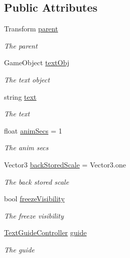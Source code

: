 \subsection*{Public Attributes}
\begin{DoxyCompactItemize}
\item 
Transform \hyperlink{class_lerp2_a_p_i_1_1_effects_1_1___text_1_1_text_guide_base_a71d7d66b8dba870a0de98ea212b8fbef}{parent}
\begin{DoxyCompactList}\small\item\em The parent \end{DoxyCompactList}\item 
Game\+Object \hyperlink{class_lerp2_a_p_i_1_1_effects_1_1___text_1_1_text_guide_base_ac6c078d7a0a19badfaedda08545ca9f6}{text\+Obj}
\begin{DoxyCompactList}\small\item\em The text object \end{DoxyCompactList}\item 
string \hyperlink{class_lerp2_a_p_i_1_1_effects_1_1___text_1_1_text_guide_base_a6fa4604a4eddd0affe6901e7b92a3002}{text}
\begin{DoxyCompactList}\small\item\em The text \end{DoxyCompactList}\item 
float \hyperlink{class_lerp2_a_p_i_1_1_effects_1_1___text_1_1_text_guide_base_af52ef664cd3eb35883e993ab5e0d449d}{anim\+Secs} = 1
\begin{DoxyCompactList}\small\item\em The anim secs \end{DoxyCompactList}\item 
Vector3 \hyperlink{class_lerp2_a_p_i_1_1_effects_1_1___text_1_1_text_guide_base_a6ed2f01fd5e9d19527a36e8fd6ed2d46}{back\+Stored\+Scale} = Vector3.\+one
\begin{DoxyCompactList}\small\item\em The back stored scale \end{DoxyCompactList}\item 
bool \hyperlink{class_lerp2_a_p_i_1_1_effects_1_1___text_1_1_text_guide_base_a93c1bfa021b2b0ea382f7e4cafe6f895}{freeze\+Visibility}
\begin{DoxyCompactList}\small\item\em The freeze visibility \end{DoxyCompactList}\item 
\hyperlink{class_lerp2_a_p_i_1_1_effects_1_1___text_1_1_controllers_1_1_text_guide_controller}{Text\+Guide\+Controller} \hyperlink{class_lerp2_a_p_i_1_1_effects_1_1___text_1_1_text_guide_base_aa31b15814a390b4ca14f1c586b544870}{guide}
\begin{DoxyCompactList}\small\item\em The guide \end{DoxyCompactList}\end{DoxyCompactItemize}
